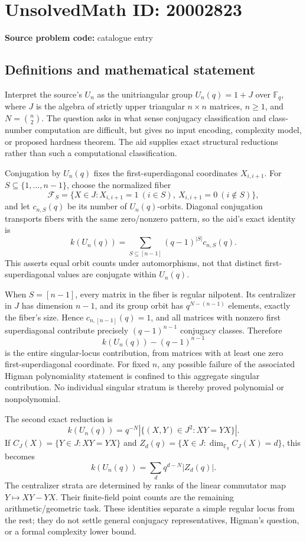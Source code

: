 \documentclass[11pt]{article}
\newcommand{\F}{\mathbb{F}}
\begin{document}
\section*{UnsolvedMath ID: 20002823}
\textbf{Source problem code:} catalogue entry
\subsection{Definitions and mathematical statement}
Interpret the source's \(U_n\) as the unitriangular group \(U_n(q)=1+J\) over \(\F_q\), where \(J\) is the algebra of strictly upper triangular \(n\times n\) matrices, \(n\ge1\), and \(N=\binom n2\). The question asks in what sense conjugacy classification and class-number computation are difficult, but gives no input encoding, complexity model, or proposed hardness theorem. The aid supplies exact structural reductions rather than such a computational classification.

Conjugation by \(U_n(q)\) fixes the first-superdiagonal coordinates \(X_{i,i+1}\). For \(S\subseteq\{1,\ldots,n-1\}\), choose the normalized fiber
\[
 \mathcal F_S=\{X\in J:X_{i,i+1}=1\ (i\in S),\ X_{i,i+1}=0\ (i\notin S)\},
\]
and let \(c_{n,S}(q)\) be its number of \(U_n(q)\)-orbits. Diagonal conjugation transports fibers with the same zero/nonzero pattern, so the aid's exact identity is
\[
 k(U_n(q))=\sum_{S\subseteq[n-1]}(q-1)^{|S|}c_{n,S}(q).
\]
This asserts equal orbit counts under automorphisms, not that distinct first-superdiagonal values are conjugate within \(U_n(q)\).

When \(S=[n-1]\), every matrix in the fiber is regular nilpotent. Its centralizer in \(J\) has dimension \(n-1\), and its group orbit has \(q^{N-(n-1)}\) elements, exactly the fiber's size. Hence \(c_{n,[n-1]}(q)=1\), and all matrices with nonzero first superdiagonal contribute precisely \((q-1)^{n-1}\) conjugacy classes. Therefore
\[
 k(U_n(q))-(q-1)^{n-1}
\]
is the entire singular-locus contribution, from matrices with at least one zero first-superdiagonal coordinate. For fixed \(n\), any possible failure of the associated Higman polynomiality statement is confined to this aggregate singular contribution. No individual singular stratum is thereby proved polynomial or nonpolynomial.

The second exact reduction is
\[
 k(U_n(q))=q^{-N}|\{(X,Y)\in J^2:XY=YX\}|.
\]
If \(C_J(X)=\{Y\in J:XY=YX\}\) and \(Z_d(q)=\{X\in J:\dim_{\F_q}C_J(X)=d\}\), this becomes
\[
 k(U_n(q))=\sum_d q^{d-N}|Z_d(q)|.
\]
The centralizer strata are determined by ranks of the linear commutator map \(Y\mapsto XY-YX\). Their finite-field point counts are the remaining arithmetic/geometric task. These identities separate a simple regular locus from the rest; they do not settle general conjugacy representatives, Higman's question, or a formal complexity lower bound.
\end{document}
